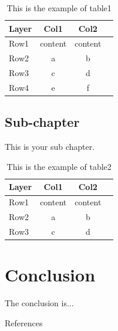 \documentclass[12pt, twoside , openright]{book}
\begin{document}
	\begin{table}[h!]
		\begin{center}
			\caption{This is the example of table1}
			\label{table:table1}
			\begin{tabular}{|l|c|c|c|}
				\hline
				\textbf{Layer} & \textbf{Col1} & \textbf{Col2} \\ %
				\hline
				Row1 & content & content \\ %
				Row2 & a & b \\ %
				Row3 & c & d \\ %
				Row4 & e & f \\ %
				\hline
			\end{tabular}
		\end{center}
	\end{table}
	
	\section{Sub-chapter}\label{sub_chapter32}
	This is your sub chapter. \blindtext[2]
	\begin{table}[h!]
		\begin{center}
			\caption{This is the example of table2}
			\label{table:table2}
			\begin{tabular}{|l|c|c|c|}
				\hline
				\textbf{Layer} & \textbf{Col1} & \textbf{Col2} \\ %
				\hline
				Row1 & content & content \\ %
				Row2 & a & b \\ %
				Row3 & c & d \\ %
				\hline
			\end{tabular}
		\end{center}
	\end{table}
	
	
	
	
	\chapter{Conclusion}
	The conclusion is... \blindtext[1] %
	\newpage
	\mbox{}
	\newpage
	
	
	
	\begin{center}
		{\chinnesesize References}
	\end{center}
	
	
	
	\newpage
	\mbox{}
	\newpage
	
\end{document}
